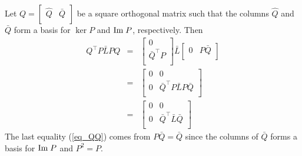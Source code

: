 \documentclass{aims}
\newcommand{\image}{{\rm Im\;}}
\begin{document}
Let $Q=\left[
                                   \begin{array}{cc}
                                     \hat{Q} & \bar{Q} \\
                                   \end{array}
                                 \right]$ be a square orthogonal matrix such that the columns $\hat{Q}$ and $ \bar{Q}$ form a basis for $\ker P$ and $\image P$, respectively.
Then \begin{eqnarray}Q^{\top}P\bar{L}PQ&=&\left[
                        \begin{array}{c}
                          0 \\
                          \bar{Q}^{\top}P \\
                        \end{array}
                      \right]\bar{L}\left[
                                      \begin{array}{cc}
                                        0 & P\bar{Q} \\
                                      \end{array}
                                    \right]\\
                                    &=&
\left[
                        \begin{array}{cc}
                          0 & 0 \\
                          0 & \bar{Q}^{\top}P\bar{L}P\bar{Q}\\
                        \end{array}
                      \right]\\
                      &=& \left[
                        \begin{array}{cc}
                          0 & 0 \\
                          0 & \bar{Q}^{\top}\bar{L}\bar{Q}\\
                        \end{array}
                      \right]\label{eq_QQ}
\end{eqnarray} The last equality (\ref{eq_QQ}) comes from $P\bar{Q}=\bar{Q}$ since the columns of $\bar{Q}$ forms a basis for $\image P$ and $P^2=P$.
\end{document}
